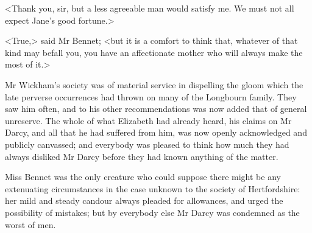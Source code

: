 <Thank you, sir, but a less agreeable man would satisfy me. We must not all expect Jane's good fortune.>

<True,> said Mr Bennet; <but it is a comfort to think that, whatever of that kind may befall you, you have an affectionate mother who will always make the most of it.>

Mr Wickham's society was of material service in dispelling the gloom which the late perverse occurrences had thrown on many of the Longbourn family. They saw him often, and to his other recommendations was now added that of general unreserve. The whole of what Elizabeth had already heard, his claims on Mr Darcy, and all that he had suffered from him, was now openly acknowledged and publicly canvassed; and everybody was pleased to think how much they had always disliked Mr Darcy before they had known anything of the matter.

Miss Bennet was the only creature who could suppose there might be any extenuating circumstances in the case unknown to the society of Hertfordshire: her mild and steady candour always pleaded for allowances, and urged the possibility of mistakes; but by everybody else Mr Darcy was condemned as the worst of men.